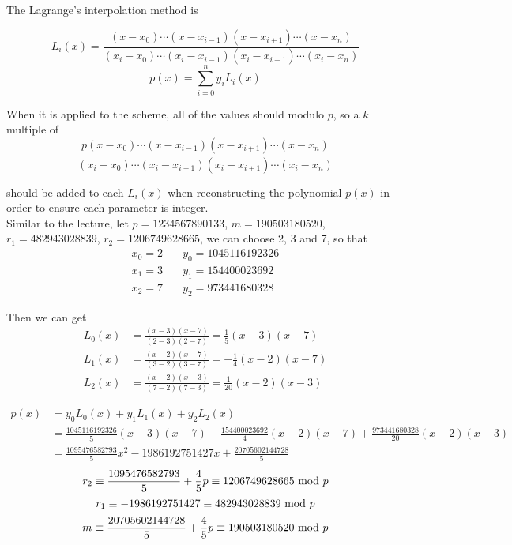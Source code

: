 \documentclass{article}
\renewcommand{\mod}{{\rm\ mod\ }}
\begin{document}
The Lagrange’s interpolation method is

$$L_i(x)=\frac{(x-x_0)\cdots(x-x_{i-1})(x-x_{i+1})\cdots(x-x_n)}{(x_i-x_0)\cdots(x_i-x_{i-1})(x_i-x_{i+1})\cdots(x_i-x_n)}$$
$$$$
$$p(x)=\sum_{i=0}^n y_iL_i(x)$$

When it is applied to the scheme, all of the values should modulo $p$, so a $k$ multiple of $$\frac{p(x-x_0)\cdots(x-x_{i-1})(x-x_{i+1})\cdots(x-x_n)}{(x_i-x_0)\cdots(x_i-x_{i-1})(x_i-x_{i+1})\cdots(x_i-x_n)}$$ 

should be added to each $L_i(x)$ when reconstructing the polynomial $p(x)$ in order to ensure each parameter is integer. \\

Similar to the lecture, let $p=1234567890133$, $m=190503180520$, $r_1=482943028839$, $r_2=1206749628665$, we can choose 2, 3 and 7, so that
\begin{align*}
x_0=2 &\quad y_0=1045116192326 \\
x_1=3 &\quad y_1=154400023692 \\
x_2=7 &\quad y_2=973441680328
\end{align*}

Then we can get
\begin{align*}
L_0(x) &= \frac{(x-3)(x-7)}{(2-3)(2-7)}=\frac{1}{5}(x-3)(x-7) \\
L_1(x) &= \frac{(x-2)(x-7)}{(3-2)(3-7)}=-\frac{1}{4}(x-2)(x-7) \\
L_2(x) &= \frac{(x-2)(x-3)}{(7-2)(7-3)}=\frac{1}{20}(x-2)(x-3)
\end{align*}

\begin{align*}
p(x) &= y_0L_0(x)+y_1L_1(x)+y_2L_2(x) \\
&= \frac{1045116192326}{5}(x-3)(x-7)-\frac{154400023692}{4}(x-2)(x-7)+\frac{973441680328}{20}(x-2)(x-3) \\
&= \frac{1095476582793}{5}x^2-1986192751427x+\frac{20705602144728}{5}
\end{align*}
$$r_2 \equiv \frac{1095476582793}{5}+\frac{4}{5}p \equiv 1206749628665 \mod p$$
$$r_1 \equiv -1986192751427 \equiv 482943028839 \mod p$$
$$m \equiv \frac{20705602144728}{5}+\frac{4}{5}p \equiv 190503180520 \mod p$$
\end{document}
